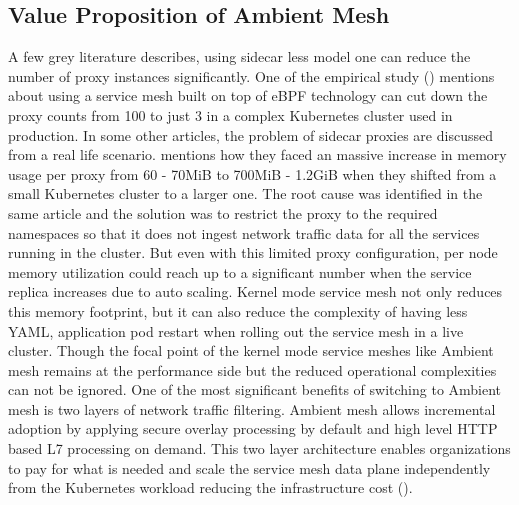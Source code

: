  \subsection{Value Proposition of Ambient Mesh}
 A few grey literature describes, using sidecar less model one can reduce the number of proxy instances significantly. One of the empirical study (\cite{thenewstackRice2021}) mentions about using a service mesh built on top of eBPF technology can cut down the proxy counts from 100 to just 3 in a complex Kubernetes cluster used in production. In some other articles, the problem of sidecar proxies are discussed from a real life scenario. \cite{mediumSinghal2021} mentions how they faced an massive increase in memory usage per proxy from 60 - 70MiB to 700MiB - 1.2GiB when they shifted from a small Kubernetes cluster to a larger one. The root cause was identified in the same article and the solution was to restrict the proxy to the required namespaces so that it does not ingest network traffic data for all the services running in the cluster. But even with this limited proxy configuration, per node memory utilization could reach up to a significant number when the service replica increases due to auto scaling. Kernel mode service mesh not only reduces this memory footprint, but it can also reduce the complexity of having less YAML, application pod restart when rolling out the service mesh in a live cluster. Though the focal point of the kernel mode service meshes like Ambient mesh remains at the performance side but the reduced operational complexities can not be ignored. One of the most significant benefits of switching to Ambient mesh is two layers of network traffic filtering. Ambient mesh allows incremental adoption by applying secure overlay processing by default and high level HTTP based L7 processing on demand. This two layer architecture enables organizations to pay for what is needed and scale the service mesh data plane independently from the Kubernetes workload reducing the infrastructure cost (\cite{infoqSunCampbell2023}).

